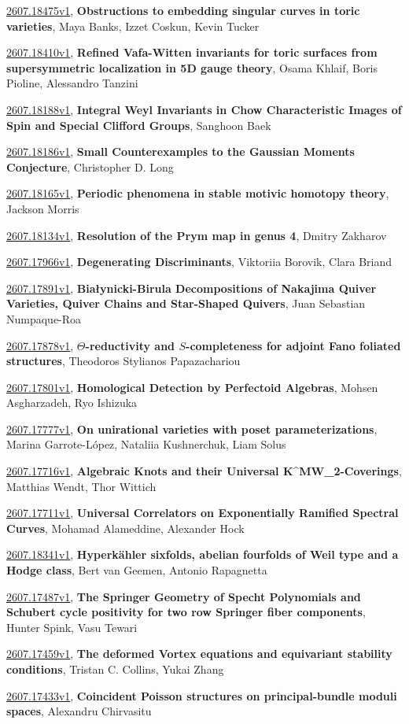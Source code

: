 \documentclass[9pt, a4paper]{article}
\theoremstyle{plain}
\theoremstyle{definition}
\theoremstyle{remark}
\newcommand{\arxiv}[3]{\href{https://arxiv.org/abs/#1}{#1}, \textbf{\textcolor{arxivblue}{#2}}, #3}
\begin{document}
\arxiv{2607.18475v1}{Obstructions to embedding singular curves in toric varieties}{Maya Banks, Izzet Coskun, Kevin Tucker}

\arxiv{2607.18410v1}{Refined Vafa-Witten invariants for toric surfaces from supersymmetric localization in 5D gauge theory}{Osama Khlaif, Boris Pioline, Alessandro Tanzini}

\arxiv{2607.18188v1}{Integral Weyl Invariants in Chow Characteristic Images of Spin and Special Clifford Groups}{Sanghoon Baek}

\arxiv{2607.18186v1}{Small Counterexamples to the Gaussian Moments Conjecture}{Christopher D. Long}

\arxiv{2607.18165v1}{Periodic phenomena in stable motivic homotopy theory}{Jackson Morris}

\arxiv{2607.18134v1}{Resolution of the Prym map in genus 4}{Dmitry Zakharov}

\arxiv{2607.17966v1}{Degenerating Discriminants}{Viktoriia Borovik, Clara Briand}

\arxiv{2607.17891v1}{Białynicki-Birula Decompositions of Nakajima Quiver Varieties, Quiver Chains and Star-Shaped Quivers}{Juan Sebastian Numpaque-Roa}

\arxiv{2607.17878v1}{$Θ$-reductivity and $S$-completeness for adjoint Fano foliated structures}{Theodoros Stylianos Papazachariou}

\arxiv{2607.17801v1}{Homological Detection by Perfectoid Algebras}{Mohsen Asgharzadeh, Ryo Ishizuka}

\arxiv{2607.17777v1}{On unirational varieties with poset parameterizations}{Marina Garrote-López, Nataliia Kushnerchuk, Liam Solus}

\arxiv{2607.17716v1}{Algebraic Knots and their Universal K^MW_2-Coverings}{Matthias Wendt, Thor Wittich}

\arxiv{2607.17711v1}{Universal Correlators on Exponentially Ramified Spectral Curves}{Mohamad Alameddine, Alexander Hock}

\arxiv{2607.18341v1}{Hyperkähler sixfolds, abelian fourfolds of Weil type and a Hodge class}{Bert van Geemen, Antonio Rapagnetta}

\arxiv{2607.17487v1}{The Springer Geometry of Specht Polynomials and Schubert cycle positivity for two row Springer fiber components}{Hunter Spink, Vasu Tewari}

\arxiv{2607.17459v1}{The deformed Vortex equations and equivariant stability conditions}{Tristan C. Collins, Yukai Zhang}

\arxiv{2607.17433v1}{Coincident Poisson structures on principal-bundle moduli spaces}{Alexandru Chirvasitu}
\end{document}
